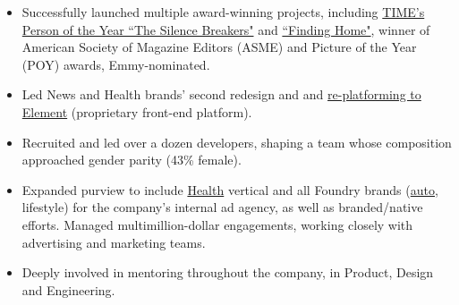 \documentclass[a4paper,12pt]{memoir} %
\begin{document}
\userinformation %

\framebreak %









\begin{itemize}
	\item Successfully launched multiple award-winning projects, including  \href{http://time.com/time-person-of-the-year-2017-silence-breakers/}{TIME's Person of the Year ``The Silence Breakers"} and \href{http://time.com/finding-home/}{``Finding Home"}, winner of American Society of Magazine Editors (ASME) and Picture of the Year (POY) awards, Emmy-nominated.
	\item Led News and Health brands' second redesign and and \href{https://medium.com/@acharalambides/element-the-digital-unification-of-time-inc-979656149fd3}{re-platforming to Element} (proprietary front-end platform).
	\item Recruited and led over a dozen developers, shaping a team whose composition approached gender parity (43\% female).
	\item Expanded purview to include \href{http://www.health.com}{Health} vertical and all Foundry brands (\href{http://thedrive.com}{auto}, lifestyle) for the company's internal ad agency, as well as branded/native efforts. Managed multimillion-dollar engagements, working closely with advertising and marketing teams.
	\item Deeply involved in mentoring throughout the company, in Product, Design and Engineering. 
\end{itemize}
\Sep %
\end{document}
